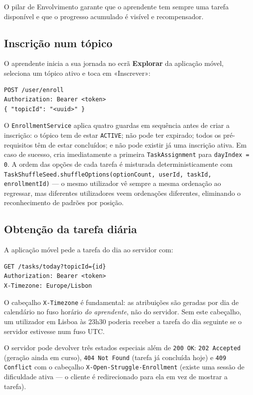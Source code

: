 O pilar de Envolvimento garante que o aprendente tem sempre uma tarefa
disponível e que o progresso acumulado é visível e recompensador.

\subsection*{Inscrição num tópico}

O aprendente inicia a sua jornada no ecrã \textbf{Explorar} da aplicação
móvel, seleciona um tópico ativo e toca em «Inscrever»:

\begin{verbatim}
POST /user/enroll
Authorization: Bearer <token>
{ "topicId": "<uuid>" }
\end{verbatim}

O \texttt{EnrollmentService} aplica quatro guardas em sequência antes de
criar a inscrição: o tópico tem de estar \texttt{ACTIVE}; não pode ter
expirado; todos os pré-requisitos têm de estar concluídos; e não pode
existir já uma inscrição ativa.
Em caso de sucesso, cria imediatamente a primeira \texttt{TaskAssignment}
para \texttt{dayIndex = 0}.
A ordem das opções de cada tarefa é misturada deterministicamente com
\texttt{TaskShuffleSeed.shuffleOptions(optionCount, userId, taskId,
enrollmentId)} — o mesmo utilizador vê sempre a mesma ordenação ao
regressar, mas diferentes utilizadores veem ordenações diferentes,
eliminando o reconhecimento de padrões por posição.

\subsection*{Obtenção da tarefa diária}

A aplicação móvel pede a tarefa do dia ao servidor com:

\begin{verbatim}
GET /tasks/today?topicId={id}
Authorization: Bearer <token>
X-Timezone: Europe/Lisbon
\end{verbatim}

O cabeçalho \texttt{X-Timezone} é fundamental: as atribuições são geradas
por dia de calendário no fuso horário \emph{do aprendente}, não do
servidor.
Sem este cabeçalho, um utilizador em Lisboa às 23h30 poderia receber a
tarefa do dia seguinte se o servidor estivesse num fuso UTC.

O servidor pode devolver três estados especiais além de \texttt{200 OK}:
\texttt{202 Accepted} (geração ainda em curso),
\texttt{404 Not Found} (tarefa já concluída hoje) e
\texttt{409 Conflict} com o cabeçalho
\texttt{X-Open-Struggle-Enrollment} (existe uma sessão de dificuldade
ativa — o cliente é redirecionado para ela em vez de mostrar a tarefa).

